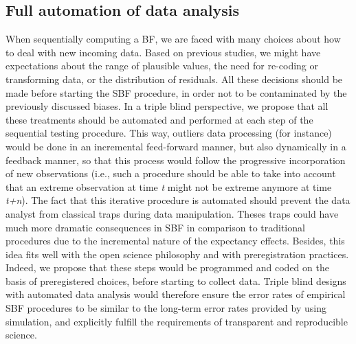 \documentclass[a4paper,man,natbib,floatsintext,donotrepeattitle]{apa6}
\begin{document}
\subsection{Full automation of data analysis}
When sequentially computing a BF, we are faced with many choices about how to deal with new incoming data. Based on previous studies, we might have expectations about the range of plausible values, the need for re-coding or transforming data, or the distribution of residuals. All these decisions should be made before starting the SBF procedure, in order not to be contaminated by the previously discussed biases. In a triple blind perspective, we propose that all these treatments should be automated and performed at each step of the sequential testing procedure. This way, outliers data processing (for instance) would be done in an incremental feed-forward manner, but also dynamically in a feedback manner, so that this process would follow the progressive incorporation of new observations (i.e., such a procedure should be able to take into account that an extreme observation at time \textit{t} might not be extreme anymore at time \textit{t+n}). The fact that this iterative procedure is automated should prevent the data analyst from classical traps during data manipulation. Theses traps could have much more dramatic consequences in SBF in comparison to traditional procedures due to the incremental  nature of the expectancy effects. Besides, this idea fits well with the open science philosophy and with preregistration practices. Indeed, we propose that these steps would be programmed and coded on the basis of preregistered choices, before starting to collect data. Triple blind designs with automated data analysis would therefore ensure the error rates of empirical SBF procedures to be similar to the long-term error rates provided by \cite{schonbrodt_sequential_2017} using simulation, and explicitly fulfill the requirements of transparent and reproducible science. \par

\end{document}
